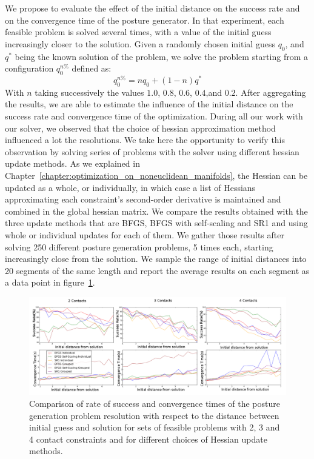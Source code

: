 We propose to evaluate the effect of the initial distance on the success rate and on the convergence time of the posture generator.
In that experiment, each feasible problem is solved several times, with a value of the initial guess increasingly closer to the solution.
Given a randomly chosen initial guess $q_0$, and $q^*$ being the known solution of the problem, we solve the problem starting from a configuration $q_0^{n\%}$ defined as:
\begin{equation}
  q_0^{n\%} = n q_0 + (1-n)q^*
\end{equation}
With $n$ taking successively the values $1.0$, $0.8$, $0.6$, $0.4$,and $0.2$.
After aggregating the results, we are able to estimate the influence of the initial distance on the success rate and convergence time of the optimization.
During all our work with our solver, we observed that the choice of hessian approximation method influenced a lot the resolutions.
We take here the opportunity to verify this observation by solving series of problems with the solver using different hessian update methods.
As we explained in Chapter~\ref{chapter:optimization_on_noneuclidean_manifolds}, the Hessian can be updated as a whole, or individually, in which case a list of Hessians approximating each constraint's second-order derivative is maintained and combined in the global hessian matrix.
We compare the results obtained with the three update methods that are BFGS, BFGS with self-scaling and SR1 and using whole or individual updates for each of them.
We gather those results after solving 250 different posture generation problems, 5 times each, starting increasingly close from the solution.
We sample the range of initial distances into 20 segments of the same length and report the average results on each segment as a data point in figure~\ref{fig:evalPG}.

\begin{figure}[htb]
\centering
  \includegraphics[width=\linewidth]{evalPG/resWithSR1Grouped.png}
  \caption{Comparison of rate of success and convergence times of the posture generation problem resolution with respect to the distance between initial guess and solution for sets of feasible problems with 2, 3 and 4 contact constraints and for different choices of Hessian update methods.}
\label{fig:evalPG}
\end{figure}

